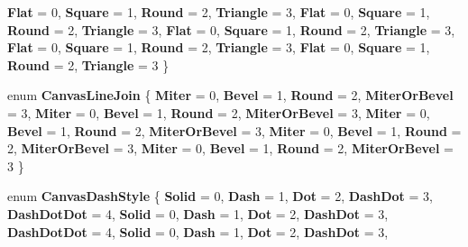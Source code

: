 \begin{DoxyCompactItemize}
{\bfseries Flat} = 0, 
{\bfseries Square} = 1, 
{\bfseries Round} = 2, 
{\bfseries Triangle} = 3, 
\newline
{\bfseries Flat} = 0, 
{\bfseries Square} = 1, 
{\bfseries Round} = 2, 
{\bfseries Triangle} = 3, 
\newline
{\bfseries Flat} = 0, 
{\bfseries Square} = 1, 
{\bfseries Round} = 2, 
{\bfseries Triangle} = 3, 
\newline
{\bfseries Flat} = 0, 
{\bfseries Square} = 1, 
{\bfseries Round} = 2, 
{\bfseries Triangle} = 3, 
\newline
{\bfseries Flat} = 0, 
{\bfseries Square} = 1, 
{\bfseries Round} = 2, 
{\bfseries Triangle} = 3
 \}
\item 
\mbox{\label{namespace_microsoft_1_1_graphics_1_1_canvas_1_1_geometry_a962f9c8c901a160f4a74f2be716840d7}} 
enum {\bfseries Canvas\+Line\+Join} \{ \newline
{\bfseries Miter} = 0, 
{\bfseries Bevel} = 1, 
{\bfseries Round} = 2, 
{\bfseries Miter\+Or\+Bevel} = 3, 
\newline
{\bfseries Miter} = 0, 
{\bfseries Bevel} = 1, 
{\bfseries Round} = 2, 
{\bfseries Miter\+Or\+Bevel} = 3, 
\newline
{\bfseries Miter} = 0, 
{\bfseries Bevel} = 1, 
{\bfseries Round} = 2, 
{\bfseries Miter\+Or\+Bevel} = 3, 
\newline
{\bfseries Miter} = 0, 
{\bfseries Bevel} = 1, 
{\bfseries Round} = 2, 
{\bfseries Miter\+Or\+Bevel} = 3, 
\newline
{\bfseries Miter} = 0, 
{\bfseries Bevel} = 1, 
{\bfseries Round} = 2, 
{\bfseries Miter\+Or\+Bevel} = 3
 \}
\item 
\mbox{\label{namespace_microsoft_1_1_graphics_1_1_canvas_1_1_geometry_ab285a1e0da5c91c32bbb2fbbec7ad1c0}} 
enum {\bfseries Canvas\+Dash\+Style} \{ \newline
{\bfseries Solid} = 0, 
{\bfseries Dash} = 1, 
{\bfseries Dot} = 2, 
{\bfseries Dash\+Dot} = 3, 
\newline
{\bfseries Dash\+Dot\+Dot} = 4, 
{\bfseries Solid} = 0, 
{\bfseries Dash} = 1, 
{\bfseries Dot} = 2, 
\newline
{\bfseries Dash\+Dot} = 3, 
{\bfseries Dash\+Dot\+Dot} = 4, 
{\bfseries Solid} = 0, 
{\bfseries Dash} = 1, 
\newline
{\bfseries Dot} = 2, 
{\bfseries Dash\+Dot} = 3, 

\end{DoxyCompactItemize}
